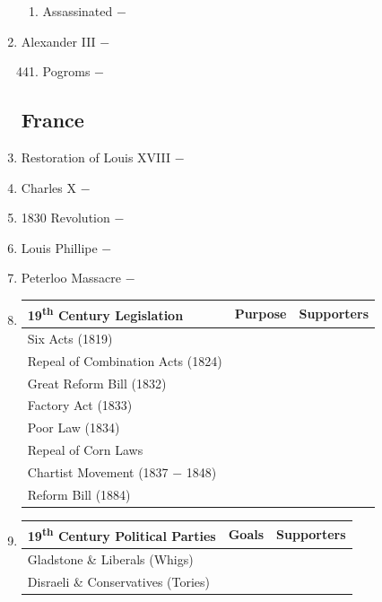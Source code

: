 \documentclass[12pt]{article}
\begin{document}
\begin{enumerate}
\begin{enumerate}[label=\arabic{*}.]
\item Assassinated $-$

\end{enumerate}
\setcounter{enumi}{439}

\item Alexander III $-$ 


\begin{enumerate}[label=\arabic{*}.]
\setcounter{enumii}{440}

\item Pogroms $-$ 

\end{enumerate}
\setcounter{enumi}{441}

\subsection{France}

\item Restoration of Louis XVIII $-$ 

\item Charles X $-$ 

\item 1830 Revolution $-$ 

\item Louis Phillipe $-$

\item Peterloo Massacre $-$ 

\item \begin{tabular}{l c c}

19\textsuperscript{th} Century Legislation & Purpose & Supporters \\
\hline
Six Acts (1819) & & \\
\hline
Repeal of Combination Acts (1824) & & \\
\hline
Great Reform Bill (1832) & & \\
\hline
Factory Act (1833) & & \\
\hline
Poor Law (1834) & & \\
\hline
Repeal of Corn Laws & & \\
\hline
Chartist Movement (1837 $-$ 1848) & & \\
\hline 
Reform Bill (1884) & & \\
\end{tabular}

\item \begin{tabular}{l c c}
\hline
19\textsuperscript{th} Century Political Parties & Goals & Supporters \\
\hline
Gladstone \& Liberals (Whigs) & & \\
\hline
Disraeli \& Conservatives (Tories) & & \\
\hline
\end{tabular}


\end{enumerate}
\end{document}

